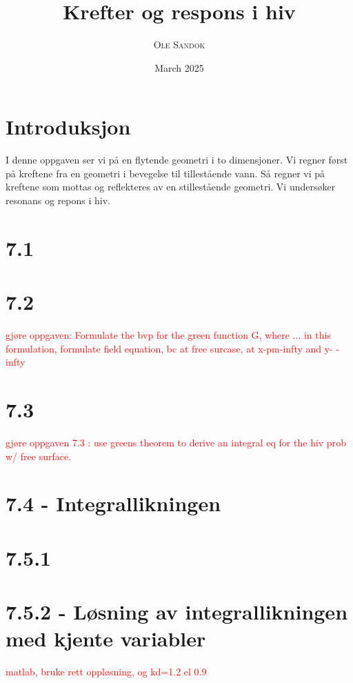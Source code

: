 \documentclass{article}
\title{Krefter og respons i hiv}
\subtitle{\textit{\headcourse}}
\author{\textsc{Ole Sandok}}
\date{March 2025} %
\begin{document}
\maketitle
\thispagestyle{fancy} 

\section{Introduksjon}
I denne oppgaven ser vi på en flytende geometri i to dimensjoner. Vi regner først på kreftene fra en geometri i bevegelse til tillestående vann. Så regner vi på kreftene som mottas og reflekteres av en stillestående geometri. Vi undersøker resonans og repons i hiv. 

\section{7.1}


\section{7.2}

\textcolor{red}{gjøre oppgaven: Formulate the bvp for the green function G, where ... in this formulation, formulate field equation, bc at free surcase, at x-pm-infty and y- -infty}

\section{7.3}

\textcolor{red}{gjøre oppgaven 7.3 : use greens theorem to derive an integral eq for the hiv prob w/ free surface.}

\section{7.4 - Integrallikningen} %


\section{7.5.1} %


\section{7.5.2 - Løsning av integrallikningen med kjente variabler}

\textcolor{red}{matlab, bruke rett oppløsning, og kd=1.2 el 0.9}
\end{document}

